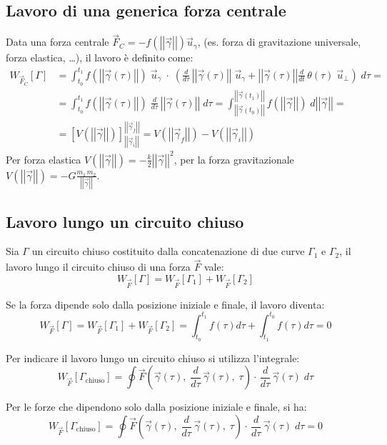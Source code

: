 \documentclass[a4paper]{article}
\newcommand\ug{\vec{u}_\gamma}
\newcommand\uper{\vec{u}_\perp}
\newcommand\ftau{\vec{F}\left(\vec{\gamma}(\tau), \; \dtau \vec{\gamma}(\tau), \; \tau\right)}
\newcommand\dt{\frac{d}{dt}\,}
\newcommand\dtau{\frac{d}{d\tau}\,}
\newcommand\vmod[1]{\left|\left|{#1}\right|\right|}
\begin{document}
\subsection{Lavoro di una generica forza centrale}
Data una forza centrale \(\vec{F}_C = - f(\vmod{\vec{\gamma}}) \ug\), (es. forza di gravitazione universale, forza elastica, \dots),
il lavoro è definito come:
\begin{align*}
	W_{\vec{F}_C}[\Gamma] &= \int_{t_0}^{t_1} f(\vmod{\vec{\gamma}(\tau)}) \; \ug \; \cdot \; \left( \dtau \vmod{\vec{\gamma}(\tau)} \; \ug + \vmod{\vec{\gamma}(\tau)} \dt \theta(\tau) \; \uper \right) \; d\tau = \\
	&= \int_{t_0}^{t_1} f(\vmod{\vec{\gamma}(\tau)}) \; \dtau \vmod{\vec{\gamma}(\tau)} \; d\tau = \int_{\vmod{\vec{\gamma}(t_0)}}^{\vmod{\vec{\gamma}(t_1)}} f(\vmod{\vec{\gamma}}) \; d\vmod{\vec{\gamma}} = \\
	&= \left[ V(\vmod{\vec{\gamma}}) \right]_{\vmod{\vec{\gamma}_i}}^{\vmod{\vec{\gamma}_f}} = V(\vmod{\vec{\gamma}_f}) - V(\vmod{\vec{\gamma}_i})
\end{align*}
Per forza elastica \(\displaystyle V(\vmod{\vec{\gamma}}) = -\frac{k}{2} \vmod{\vec{\gamma}}^2\), per la forza gravitazionale
\(\displaystyle V(\vmod{\vec{\gamma}}) = -G\frac{m_1 \, m_2}{\vmod{\vec{\gamma}}}\).

\subsection{Lavoro lungo un circuito chiuso}
Sia \(\Gamma\) un circuito chiuso costituito dalla concatenazione di due curve \(\Gamma_1\) e \(\Gamma_2\), il lavoro lungo il
circuito chiuso di una forza \(\vec{F}\) vale:
\[W_{\vec{F}}[\Gamma] = W_{\vec{F}}[\Gamma_1] + W_{\vec{F}}[\Gamma_2]\]

Se la forza dipende solo dalla posizione iniziale e finale, il lavoro diventa:
\[W_{\vec{F}}[\Gamma] = W_{\vec{F}}[\Gamma_1] + W_{\vec{F}}[\Gamma_2] = \int_{t_0}^{t_1}f(\tau) d\tau + \int_{t_1}^{t_0}f(\tau) d\tau = 0\]

Per indicare il lavoro lungo un circuito chiuso si utilizza l'integrale:
\[W_{\vec{F}}[\Gamma_\text{chiuso}] = \oint \ftau \cdot \, \dtau \vec{\gamma}(\tau) \; d\tau\]

Per le forze che dipendono solo dalla posizione iniziale e finale, si ha:
\[W_{\vec{F}}[\Gamma_\text{chiuso}] = \oint \ftau \cdot \, \dtau \vec{\gamma}(\tau) \; d\tau = 0\]

\newpage
\end{document}
